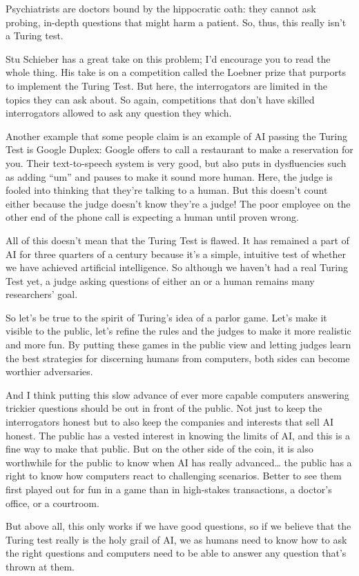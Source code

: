 Psychiatrists are doctors bound by the hippocratic oath: they cannot ask probing, in-depth questions that might harm a patient.  So, thus, this really isn’t a Turing test.

Stu Schieber has a great take on this problem; I’d encourage you to read the whole thing.  His take is on a competition called the Loebner prize that purports to implement the Turing Test.  But here, the interrogators are limited in the topics they can ask about.  So again, competitions that don’t have skilled interrogators allowed to ask any question they which.

Another example that some people claim is an example of AI passing the Turing Test is Google Duplex: Google offers to call a restaurant to make a reservation for you.  Their text-to-speech system is very good, but also puts in dysfluencies such as adding ``um'' and pauses to make it sound more human.  Here, the judge is fooled into thinking that they’re talking to a human.  But this doesn’t count either because the judge doesn’t know they’re a judge!  The poor employee on the other end of the phone call is expecting a human until proven wrong.

All of this doesn’t mean that the Turing Test is flawed.  It has remained a part of AI for three quarters of a century because it’s a simple, intuitive test of whether we have achieved artificial intelligence.  So although we haven’t had a real Turing Test yet, a judge asking questions of either an  or a human remains many researchers’ goal.

So let’s be true to the spirit of Turing’s idea of a parlor game.  Let’s make it visible to the public, let’s refine the rules and the judges to make it more realistic and more fun.  By putting these games in the public view and letting judges learn the best strategies for discerning humans from computers, both sides can become worthier adversaries.  

And I think putting this slow advance of ever more capable computers answering trickier questions should be out in front of the public.  Not just to keep the interrogators honest but to also keep the companies and interests that sell AI honest.  The public has a vested interest in knowing the limits of AI, and this is a fine way to make that public.  But on the other side of the coin, it is also worthwhile for the public to know when AI has really advanced… the public has a right to know how computers react to challenging scenarios.  Better to see them first played out for fun in a game than in high-stakes transactions, a doctor’s office, or a courtroom.

But above all, this only works if we have good questions, so if we believe that the Turing test really is the holy grail of AI, we as humans need to know how to ask the right questions and computers need to be able to answer any question that’s thrown at them.
